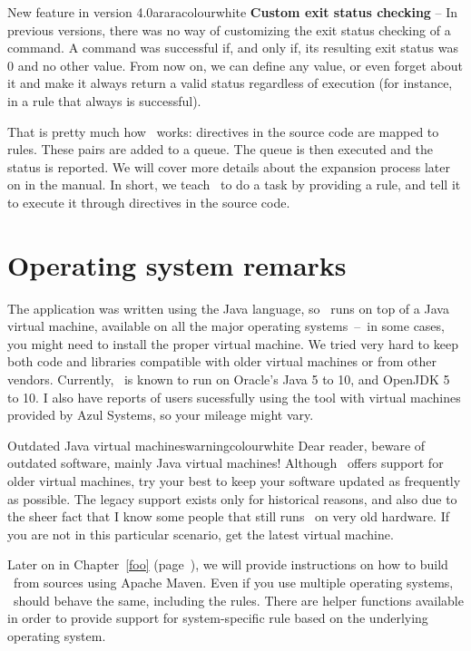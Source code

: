 \begin{messagebox}{New feature in version 4.0}{araracolour}{\icinfo}{white}
\textbf{Custom exit status checking} -- In previous versions, there was no way of customizing the exit status checking of a command. A command was successful if, and only if, its resulting exit status was 0 and no other value. From now on, we can define any value, or even forget about it and make it always return a valid status regardless of execution (for instance, in a rule that always is successful).
\end{messagebox}

That is pretty much how \arara\ works: directives in the source code are mapped to rules. These pairs are added to a queue. The queue is then executed and the status is reported. We will cover more details about the expansion process later on in the manual. In short, we teach \arara\ to do a task by providing a rule, and tell it to execute it through directives in the source code.

\section{Operating system remarks}
\label{sec:operatingsystemremarks}

The application was written using the Java language, so \arara\ runs on top of a Java virtual machine, available on all the major operating systems~--~in some cases, you might need to install the proper virtual machine. We tried very hard to keep both code and libraries compatible with older virtual machines or from other vendors. Currently, \arara\ is known to run on Oracle's Java 5 to 10, and OpenJDK 5 to 10. I also have reports of users sucessfully using the tool with virtual machines provided by Azul Systems, so your mileage might vary.

\begin{messagebox}{Outdated Java virtual machines}{warningcolour}{\icerror}{white}
Dear reader, beware of outdated software, mainly Java virtual machines! Although \arara\ offers support for older virtual machines, try your best to keep your software updated as frequently as possible. The legacy support exists only for historical reasons, and also due to the sheer fact that I know some people that still runs \arara\ on very old hardware. If you are not in this particular scenario, get the latest virtual machine.
\end{messagebox}

Later on in Chapter~\ref{foo} (page~\pageref{foo}), we will provide instructions on how to build \arara\ from sources using Apache Maven. Even if you use multiple operating systems, \arara\ should behave the same, including the rules. There are helper functions available in order to provide support for system-specific rule based on the underlying operating system.

